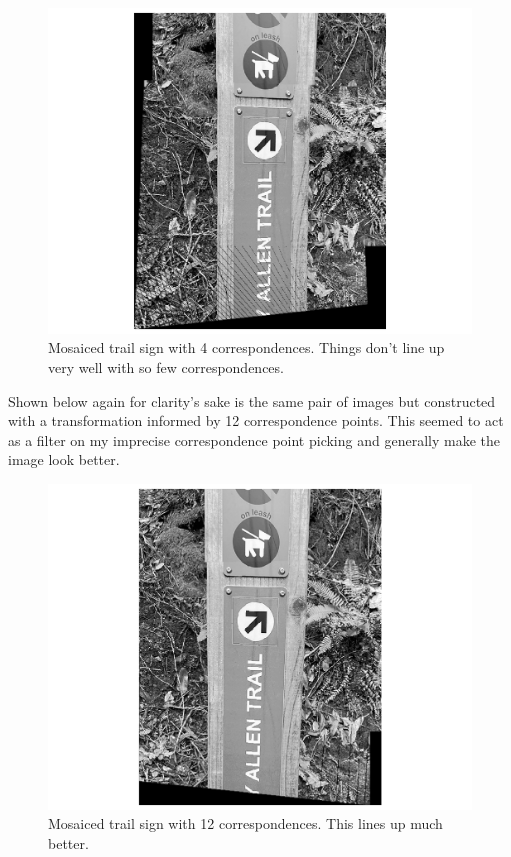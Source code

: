\documentclass[]{article}
\begin{document}
	
	\begin{figure}[H]
		\centering
		\includegraphics[width=6.5in]{test_images/sign_4_floor.png}
		\caption{Mosaiced trail sign with 4 correspondences. Things don't line up very well with so few correspondences. }
	\end{figure}

	\newpage
	
	Shown below again for clarity's sake is the same pair of images but constructed with a transformation informed by 12 correspondence points. This seemed to act as a filter on my imprecise correspondence point picking and generally make the image look better.
	
	\begin{figure}[H]
		\centering
		\includegraphics[width=6.5in]{test_images/sign_12_floor.png}
		\caption{Mosaiced trail sign with 12 correspondences. This lines up much better.}
	\end{figure}
	
\end{document}

